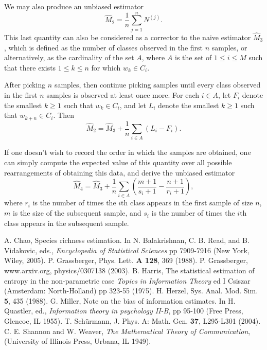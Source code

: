 \documentclass{amsart}
\begin{document}
We may also produce an unbiased estimator
$$ \hat M_2 = \frac1n \sum_{j=1}^n N^{(j)} .$$
This last quantity can also be considered as a corrector to the
naive estimator $\hat M_3$, which is defined as the number of classes
observed
in the first $n$ samples, or alternatively, as
the cardinality of the
set $A$, where
$A$ is the set of $1 \le i \le M$ such that there exists
$1 \le k \le n$ for which $w_k \in C_i$.

After picking $n$ samples, then continue picking samples until every
class observed in the first $n$ samples is observed at least once more.
For each $i \in A$, let $F_i$ denote the smallest $k \ge 1$ such that 
$w_k \in C_i$,
and let $L_i$ denote the smallest $k \ge 1$ such that $w_{k+n} \in C_i$.  
Then
$$ \hat M_2 = \hat M_3 + \frac1n \sum_{i\in A} (L_i - F_i) .$$

If one doesn't wish to record the order in which the samples are obtained, one can simply compute the expected value of this quantity over all possible
rearrangements of obtaining this data, and derive the unbiased estimator
$$ \hat M_4 = \hat M_3 + \frac1n \sum_{i\in A}
   \left(\frac{m+1}{s_i+1}-\frac{n+1}{r_i+1} \right) ,$$
where $r_i$ is the number of times the $i$th class appears in the first 
sample
of size $n$, $m$ is the size of the subsequent sample, and $s_i$ is the
number of times the $i$th class appears in the subsequent sample.

\begin{thebibliography}{99}
 A. Chao, Species richness estimation. 
In N. Balakrishnan, C. B. Read, and B. Vidakovic, eds., 
{\it Encyclopedia of Statistical Sciences} pp 7909-7916 (New York, Wiley, 2005).
 P. Grassberger, Phys. Lett. {\bf A 128}, 369 (1988).
 P. Grassberger, www.arxiv.org, physics/0307138 (2003).
 B. Harris, The statistical estimation of entropy in the 
non-parametric case {\it Topics in Information Theory} ed I Csiszar 
(Amsterdam: North-Holland) pp 323-55 (1975).
 H. Herzel, Sys. Anal. Mod. Sim. {\bf 5}, 435 (1988).
 G. Miller, Note on the bias of information estimates.
   In H. Quastler, ed., {\it Information theory in psychology II-B},
   pp 95-100 (Free Press, Glencoe, IL 1955).
 T. Sch\"urmann, J. Phys. A: Math. Gen. {\bf 37}, L295-L301 
(2004).
 C. E. Shannon and W. Weaver, {\it The Mathematical Theory of 
Communication}, (University of Illinois Press, Urbana, IL 1949).
\end{thebibliography}
\end{document}
